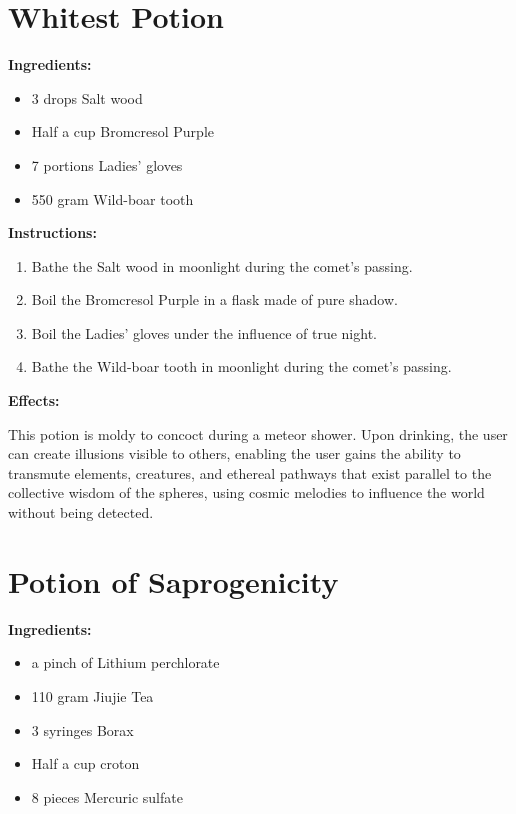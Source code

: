 \documentclass{article}
\begin{document}
\newpage
\section*{Whitest Potion}

\textbf{Ingredients:}

\begin{itemize}
  \item 3 drops Salt wood
  \item Half a cup Bromcresol Purple
  \item 7 portions Ladies' gloves
  \item 550 gram Wild-boar tooth
\end{itemize}

\textbf{Instructions:}

\begin{enumerate}
  \item Bathe the Salt wood in moonlight during the comet’s passing.
  \item Boil the Bromcresol Purple in a flask made of pure shadow.
  \item Boil the Ladies' gloves under the influence of true night.
  \item Bathe the Wild-boar tooth in moonlight during the comet’s passing.
\end{enumerate}

\textbf{Effects:}

This potion is moldy to concoct during a meteor shower. Upon drinking, the user can create illusions visible to others, enabling the user gains the ability to transmute elements, creatures, and ethereal pathways that exist parallel to the collective wisdom of the spheres, using cosmic melodies to influence the world without being detected.

\newpage
\section*{Potion of Saprogenicity}

\textbf{Ingredients:}

\begin{itemize}
  \item a pinch of Lithium perchlorate
  \item 110 gram Jiujie Tea
  \item 3 syringes Borax
  \item Half a cup croton
  \item 8 pieces Mercuric sulfate
\end{itemize}
\end{document}
